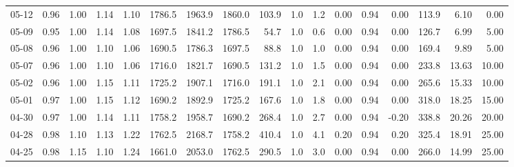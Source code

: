 \begin{threeparttable}
{\begin{tabular}{lrrrrrrrrrrrrrrrr}
  05-12 &         0.96 &           1.00 &          1.14 &          1.10 & 1786.5 & 1963.9 & 1860.0 &      103.9 &                      1.0 &                 1.2 &       0.00 &      0.94 &           0.00 &            113.9 &            6.10 &                   0.00 \\
  05-09 &         0.95 &           1.00 &          1.14 &          1.08 & 1697.5 & 1841.2 & 1786.5 &       54.7 &                      1.0 &                 0.6 &       0.00 &      0.94 &           0.00 &            126.7 &            6.99 &                   5.00 \\
  05-08 &         0.96 &           1.00 &          1.10 &          1.06 & 1690.5 & 1786.3 & 1697.5 &       88.8 &                      1.0 &                 1.0 &       0.00 &      0.94 &           0.00 &            169.4 &            9.89 &                   5.00 \\
  05-07 &         0.96 &           1.00 &          1.10 &          1.06 & 1716.0 & 1821.7 & 1690.5 &      131.2 &                      1.0 &                 1.5 &       0.00 &      0.94 &           0.00 &            233.8 &           13.63 &                  10.00 \\
  05-02 &         0.96 &           1.00 &          1.15 &          1.11 & 1725.2 & 1907.1 & 1716.0 &      191.1 &                      1.0 &                 2.1 &       0.00 &      0.94 &           0.00 &            265.6 &           15.33 &                  10.00 \\
  05-01 &         0.97 &           1.00 &          1.15 &          1.12 & 1690.2 & 1892.9 & 1725.2 &      167.6 &                      1.0 &                 1.8 &       0.00 &      0.94 &           0.00 &            318.0 &           18.25 &                  15.00 \\
  04-30 &         0.97 &           1.00 &          1.14 &          1.11 & 1758.2 & 1958.7 & 1690.2 &      268.4 &                      1.0 &                 2.7 &       0.00 &      0.94 &          -0.20 &            338.8 &           20.26 &                  20.00 \\
  04-28 &         0.98 &           1.10 &          1.13 &          1.22 & 1762.5 & 2168.7 & 1758.2 &      410.4 &                      1.0 &                 4.1 &       0.20 &      0.94 &           0.20 &            325.4 &           18.91 &                  25.00 \\
  04-25 &         0.98 &           1.15 &          1.10 &          1.24 & 1661.0 & 2053.0 & 1762.5 &      290.5 &                      1.0 &                 3.0 &       0.00 &      0.94 &           0.00 &            266.0 &           14.99 &                  25.00 \\

\end{tabular}}
\end{threeparttable}
